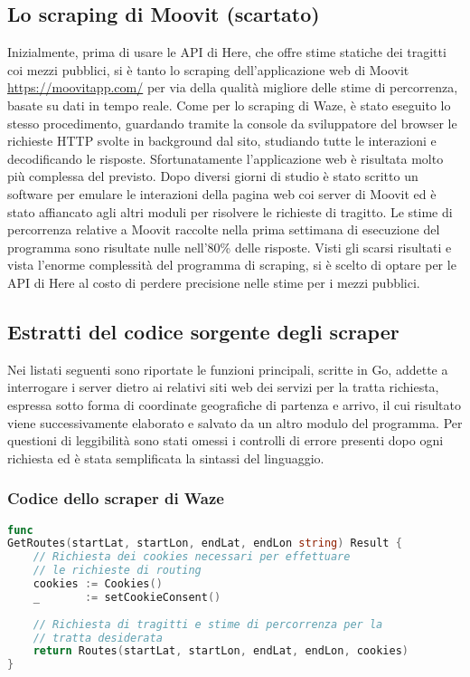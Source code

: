 \subsection{Lo scraping di Moovit (scartato)}

Inizialmente, prima di usare le API di Here, che offre stime statiche dei tragitti coi mezzi pubblici, si è tanto lo scraping dell'applicazione web di Moovit \url{https://moovitapp.com/} per via della qualità migliore delle stime di percorrenza, basate su dati in tempo reale. Come per lo scraping di Waze, è stato eseguito lo stesso procedimento, guardando tramite la console da sviluppatore del browser le richieste HTTP svolte in background dal sito, studiando tutte le interazioni e decodificando le risposte. Sfortunatamente l'applicazione web è risultata molto più complessa del previsto. Dopo diversi giorni di studio è stato scritto un software per emulare le interazioni della pagina web coi server di Moovit ed è stato affiancato agli altri moduli per risolvere le richieste di tragitto. Le stime di percorrenza relative a Moovit raccolte nella prima settimana di esecuzione del programma sono risultate nulle nell'80\% delle risposte. Visti gli scarsi risultati e vista l'enorme complessità del programma di scraping, si è scelto di optare per le API di Here al costo di perdere precisione nelle stime per i mezzi pubblici.

\subsection{Estratti del codice sorgente degli scraper}

Nei listati seguenti sono riportate le funzioni principali, scritte in Go, addette a interrogare i server dietro ai relativi siti web dei servizi per la tratta richiesta, espressa sotto forma di coordinate geografiche di partenza e arrivo, il cui risultato viene successivamente elaborato e salvato da un altro modulo del programma. Per questioni di leggibilità sono stati omessi i controlli di errore presenti dopo ogni richiesta ed è stata semplificata la sintassi del linguaggio.

\newpage
\subsubsection{Codice dello scraper di Waze}

\begin{lstlisting}[language=Go]
func
GetRoutes(startLat, startLon, endLat, endLon string) Result {
	// Richiesta dei cookies necessari per effettuare
	// le richieste di routing
	cookies := Cookies()
	_       := setCookieConsent()
	
	// Richiesta di tragitti e stime di percorrenza per la
	// tratta desiderata
	return Routes(startLat, startLon, endLat, endLon, cookies)
}
\end{lstlisting}

